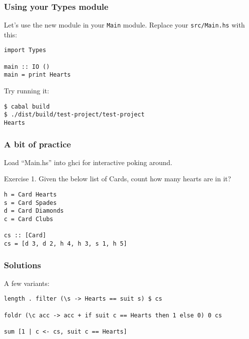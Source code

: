 \documentclass{beamer}
\begin{document}
\begin{frame}[fragile]
\frametitle{Using your Types module}

Let's use the new module in your \verb+Main+ module.  Replace your \verb+src/Main.hs+ with this:

\begin{verbatim}
import Types

main :: IO ()
main = print Hearts
\end{verbatim}

Try running it:

\begin{verbatim}
$ cabal build
$ ./dist/build/test-project/test-project
Hearts
\end{verbatim}

\end{frame}

\begin{frame}[fragile]
\frametitle{A bit of practice}

Load ``Main.hs'' into ghci for interactive poking around.

\bigskip

Exercise 1.  Given the below list of Cards, count how many hearts are
in it?

\begin{verbatim}
h = Card Hearts
s = Card Spades
d = Card Diamonds
c = Card Clubs

cs :: [Card]
cs = [d 3, d 2, h 4, h 3, s 1, h 5]
\end{verbatim}


\end{frame}

\begin{frame}[fragile]
\frametitle{Solutions}

A few variants:

{\small
\begin{verbatim}
length . filter (\s -> Hearts == suit s) $ cs

foldr (\c acc -> acc + if suit c == Hearts then 1 else 0) 0 cs

sum [1 | c <- cs, suit c == Hearts]
\end{verbatim}
}

\end{frame}
\end{document}
